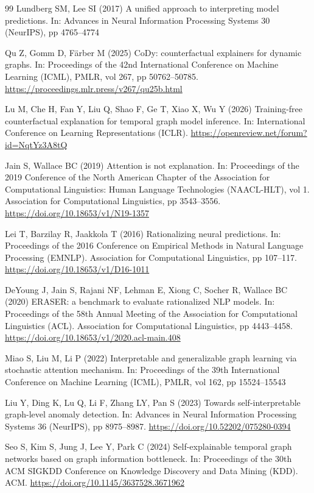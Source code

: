 \documentclass[pdflatex,sn-basic]{sn-jnl}
\theoremstyle{definition}
\theoremstyle{plain}
\begin{document}
\begin{thebibliography}{99}
Lundberg SM, Lee SI (2017) A unified approach to interpreting model predictions. In: Advances in Neural Information Processing Systems 30 (NeurIPS), pp 4765--4774

Qu Z, Gomm D, F\"arber M (2025) CoDy: counterfactual explainers for dynamic graphs. In: Proceedings of the 42nd International Conference on Machine Learning (ICML), PMLR, vol 267, pp 50762--50785. \url{https://proceedings.mlr.press/v267/qu25b.html}

Lu M, Che H, Fan Y, Liu Q, Shao F, Ge T, Xiao X, Wu Y (2026) Training-free counterfactual explanation for temporal graph model inference. In: International Conference on Learning Representations (ICLR). \url{https://openreview.net/forum?id=NqtYz3A8tQ}

Jain S, Wallace BC (2019) Attention is not explanation. In: Proceedings of the 2019 Conference of the North American Chapter of the Association for Computational Linguistics: Human Language Technologies (NAACL-HLT), vol 1. Association for Computational Linguistics, pp 3543--3556. \url{https://doi.org/10.18653/v1/N19-1357}

Lei T, Barzilay R, Jaakkola T (2016) Rationalizing neural predictions. In: Proceedings of the 2016 Conference on Empirical Methods in Natural Language Processing (EMNLP). Association for Computational Linguistics, pp 107--117. \url{https://doi.org/10.18653/v1/D16-1011}

DeYoung J, Jain S, Rajani NF, Lehman E, Xiong C, Socher R, Wallace BC (2020) ERASER: a benchmark to evaluate rationalized NLP models. In: Proceedings of the 58th Annual Meeting of the Association for Computational Linguistics (ACL). Association for Computational Linguistics, pp 4443--4458. \url{https://doi.org/10.18653/v1/2020.acl-main.408}

Miao S, Liu M, Li P (2022) Interpretable and generalizable graph learning via stochastic attention mechanism. In: Proceedings of the 39th International Conference on Machine Learning (ICML), PMLR, vol 162, pp 15524--15543

Liu Y, Ding K, Lu Q, Li F, Zhang LY, Pan S (2023) Towards self-interpretable graph-level anomaly detection. In: Advances in Neural Information Processing Systems 36 (NeurIPS), pp 8975--8987. \url{https://doi.org/10.52202/075280-0394}

Seo S, Kim S, Jung J, Lee Y, Park C (2024) Self-explainable temporal graph networks based on graph information bottleneck. In: Proceedings of the 30th ACM SIGKDD Conference on Knowledge Discovery and Data Mining (KDD). ACM. \url{https://doi.org/10.1145/3637528.3671962}


\end{thebibliography}
\end{document}

